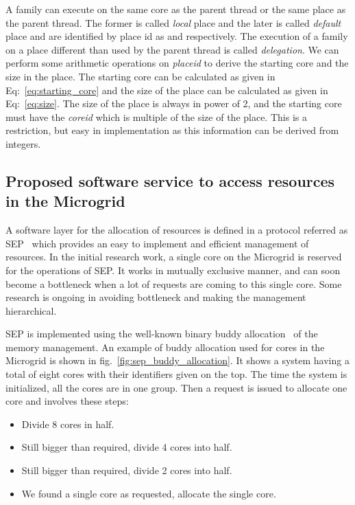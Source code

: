 \documentclass{article}
\begin{document}
A family can execute on the same core as the parent thread or the same place as
the parent thread. The former is called \emph{local} place and the later is
called \emph{default} place and are identified by place id as  and 
respectively. The execution of a family on a place different than used by the
parent thread is called \emph{delegation}. We can perform some arithmetic
operations on \emph{placeid} to derive the starting core and the size in the
place. The starting core can be calculated as given in
Eq:~\ref{eq:starting_core} and the size of the place can be calculated as given
in Eq:~\ref{eq:size}. The size of the place is always in power of 2, and the
starting core must have the \emph{coreid} which is multiple of the size of
the place. This is a restriction, but easy in implementation as this
information can be derived from integers.





\subsection{Proposed software service to access resources in the
Microgrid}

A software layer for the allocation of resources is defined in a protocol
referred as SEP~\cite{SEP,sl16} which provides an easy to implement and
efficient management of resources. In the initial research work, a single core
on the Microgrid is reserved for the operations of SEP. It works in mutually
exclusive manner, and can soon become a bottleneck when a lot of requests are
coming to this single core. Some research is ongoing in avoiding bottleneck and
making the management hierarchical.

SEP is implemented using the well-known binary buddy
allocation~\cite{Peterson:1977:BS:359605.359626} of the memory management. An
example of buddy allocation used for cores in the Microgrid is shown
in fig.~\ref{fig:sep_buddy_allocation}. It shows a system having a total of eight
cores with their identifiers given on the top. The time the system is
initialized, all the cores are in one group. Then a request is issued to
allocate one core and involves these steps:

\begin{itemize}

\item Divide 8 cores in half.

\item Still bigger than required, divide 4 cores into half.

\item Still bigger than required, divide 2 cores into half.

\item We found a single core as requested, allocate the single core.

\end{itemize}
\end{document}
